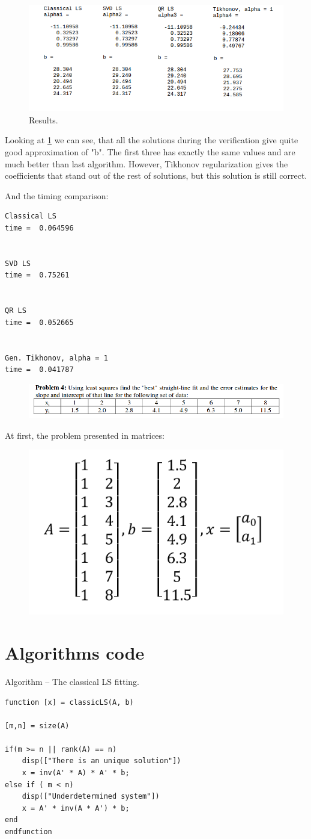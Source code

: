 \documentclass[eng,openany]{mgr}
\begin{document}
\begin{figure}[h]
\centering
\includegraphics[width=0.7\linewidth]{screenshot008}
\caption{Results.}
\label{fig:screenshot008}
\end{figure}
Looking at \ref{fig:screenshot008} we can see, that all the solutions during the verification give quite good approximation of "b". The first three has exactly the same values and are much better than last algorithm. However, Tikhonov regularization gives the coefficients that stand out of the rest of solutions, but this solution is still correct.

And the timing comparison:
\begin{lstlisting}
Classical LS
time =  0.064596


SVD LS
time =  0.75261


QR LS
time =  0.052665


Gen. Tikhonov, alpha = 1
time =  0.041787
\end{lstlisting}
\newpage

\begin{figure}[h]
\centering
\includegraphics[width=0.7\linewidth]{screenshot009}
\label{fig:screenshot009}
\end{figure}
At first, the problem presented in matrices:
\begin{figure}[h]
\centering
\includegraphics[width=0.3\linewidth]{screenshot010}
\label{fig:screenshot010}
\end{figure}



\chapter{Algorithms code}
Algorithm  -- The classical LS fitting.\\
\begin{lstlisting}
function [x] = classicLS(A, b)

[m,n] = size(A)

if(m >= n || rank(A) == n)
	disp(["There is an unique solution"])
	x = inv(A' * A) * A' * b;
else if ( m < n)
	disp(["Underdetermined system"])
	x = A' * inv(A * A') * b;
end
endfunction
\end{lstlisting}
\end{document}
